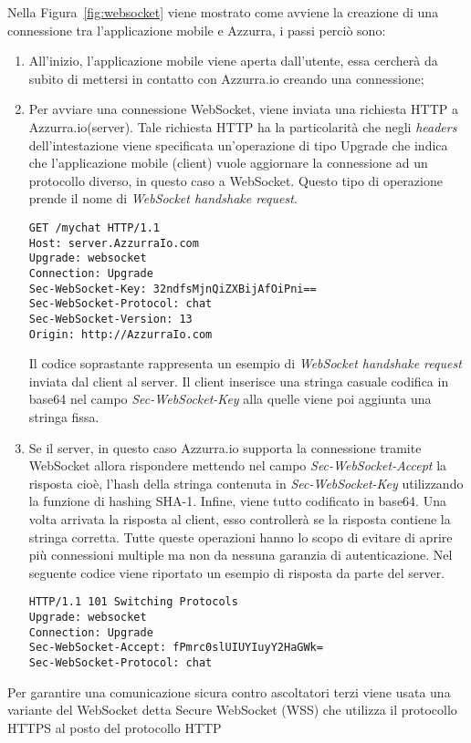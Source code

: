 Nella Figura~\ref{fig:websocket} viene mostrato come avviene la creazione di una connessione tra l'applicazione mobile e Azzurra, i passi perciò sono:
\begin{enumerate}
	\item All'inizio, l'applicazione mobile viene aperta dall'utente, essa cercherà da subito di mettersi in contatto con Azzurra.io creando una connessione;
	\item Per avviare una connessione \gls{WebSocket}\ap{[g]}, viene inviata una richiesta HTTP a Azzurra.io(server). Tale richiesta HTTP ha la particolarità che negli \emph{headers} dell’intestazione viene specificata un'operazione di tipo Upgrade che indica che l'applicazione mobile (client) vuole aggiornare la connessione ad un protocollo diverso, in questo caso a \gls{WebSocket}\ap{[g]}. Questo tipo di operazione prende il nome di \emph{WebSocket handshake request}.\\
	\begin{lstlisting}
GET /mychat HTTP/1.1
Host: server.AzzurraIo.com
Upgrade: websocket	
Connection: Upgrade		
Sec-WebSocket-Key: 32ndfsMjnQiZXBijAfOiPni==
Sec-WebSocket-Protocol: chat		
Sec-WebSocket-Version: 13		
Origin: http://AzzurraIo.com
	\end{lstlisting}
	Il codice soprastante rappresenta un esempio di \emph{WebSocket handshake request} inviata dal client al server. Il client inserisce una stringa casuale codifica in base64 nel campo \emph{Sec-WebSocket-Key} alla quelle viene poi aggiunta una stringa fissa.
	\item Se il server, in questo caso Azzurra.io supporta la connessione tramite \gls{WebSocket}\ap{[g]} allora rispondere mettendo nel campo \emph{Sec-WebSocket-Accept} la risposta cioè, l'hash della stringa contenuta in \emph{Sec-WebSocket-Key} utilizzando la funzione di hashing SHA-1. Infine, viene tutto codificato in base64. Una volta arrivata la risposta al client, esso controllerà se la risposta contiene la stringa corretta. Tutte queste operazioni hanno lo scopo di evitare di aprire più connessioni multiple ma non da nessuna garanzia di autenticazione.
	Nel seguente codice viene riportato un esempio di risposta da parte del server.\\
	\begin{lstlisting}
HTTP/1.1 101 Switching Protocols
Upgrade: websocket
Connection: Upgrade
Sec-WebSocket-Accept: fPmrc0slUIUYIuyY2HaGWk=
Sec-WebSocket-Protocol: chat
	\end{lstlisting}
\end{enumerate}
Per garantire una comunicazione sicura contro ascoltatori terzi viene usata una variante del \gls{WebSocket}\ap{[g]} detta Secure WebSocket (WSS) che utilizza il protocollo HTTPS al posto del protocollo HTTP
